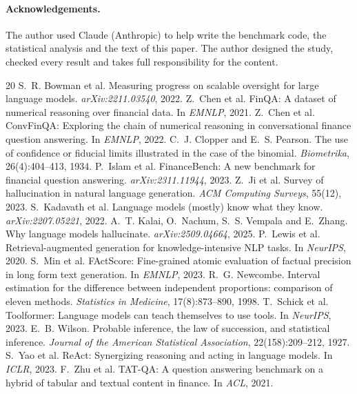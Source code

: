 \documentclass[10pt,a4paper]{article}
\begin{document}
\paragraph{Acknowledgements.} The author used Claude (Anthropic) to help write the benchmark code, the statistical
analysis and the text of this paper. The author designed the study, checked every result and takes full
responsibility for the content.

{\small
\begin{thebibliography}{20}\setlength{\itemsep}{1pt}
 S.~R. Bowman et al. Measuring progress on scalable oversight for large
language models. \emph{arXiv:2211.03540}, 2022.
 Z.~Chen et al. FinQA: A dataset of numerical reasoning over financial
data. In \emph{EMNLP}, 2021.
 Z.~Chen et al. ConvFinQA: Exploring the chain of numerical reasoning
in conversational finance question answering. In \emph{EMNLP}, 2022.
 C.~J. Clopper and E.~S. Pearson. The use of confidence or fiducial
limits illustrated in the case of the binomial. \emph{Biometrika}, 26(4):404--413, 1934.
 P.~Islam et al. FinanceBench: A new benchmark for financial
question answering. \emph{arXiv:2311.11944}, 2023.
 Z.~Ji et al. Survey of hallucination in natural language generation. \emph{ACM
Computing Surveys}, 55(12), 2023.
 S.~Kadavath et al. Language models (mostly) know what they know.
\emph{arXiv:2207.05221}, 2022.
 A.~T. Kalai, O.~Nachum, S.~S. Vempala and E.~Zhang. Why language models
hallucinate. \emph{arXiv:2509.04664}, 2025.
 P.~Lewis et al. Retrieval-augmented generation for knowledge-intensive NLP
tasks. In \emph{NeurIPS}, 2020.
 S.~Min et al. FActScore: Fine-grained atomic evaluation of factual
precision in long form text generation. In \emph{EMNLP}, 2023.
 R.~G. Newcombe. Interval estimation for the difference between independent
proportions: comparison of eleven methods. \emph{Statistics in Medicine}, 17(8):873--890, 1998.
 T.~Schick et al. Toolformer: Language models can teach themselves to use
tools. In \emph{NeurIPS}, 2023.
 E.~B. Wilson. Probable inference, the law of succession, and statistical
inference. \emph{Journal of the American Statistical Association}, 22(158):209--212, 1927.
 S.~Yao et al. ReAct: Synergizing reasoning and acting in language models.
In \emph{ICLR}, 2023.
 F.~Zhu et al. TAT-QA: A question answering benchmark on a hybrid of tabular
and textual content in finance. In \emph{ACL}, 2021.
\end{thebibliography}
}
\end{document}
